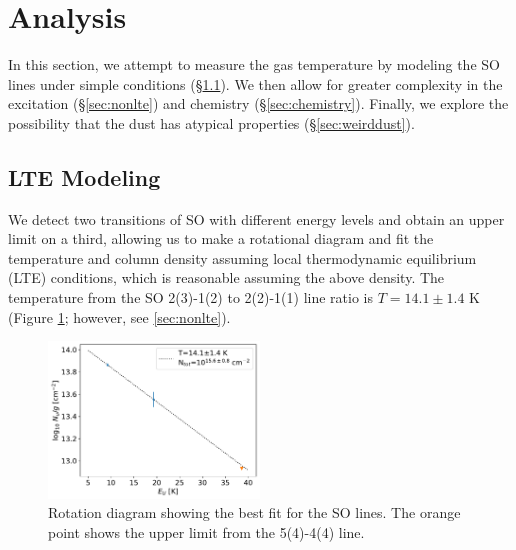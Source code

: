 \documentclass[]{aastex631}
\begin{document}
\section{Analysis}
\label{sec:analysis}

In this section, we attempt to measure the gas temperature by modeling the SO lines under simple conditions (\S \ref{sec:LTE}).
We then allow for greater complexity in the excitation (\S \ref{sec:nonlte}) and chemistry (\S \ref{sec:chemistry}).
Finally, we explore the possibility that the dust has atypical properties (\S \ref{sec:weirddust}).

\subsection{LTE Modeling}
\label{sec:LTE}
We detect two transitions of SO with different energy levels and obtain an upper limit on a third, allowing us to make a rotational diagram and fit the temperature and column density assuming local thermodynamic equilibrium (LTE) conditions, which is reasonable assuming the above density.
The temperature from the SO 2(3)-1(2) to 2(2)-1(1) line ratio is $T=14.1\pm 1.4$ K (Figure \ref{fig:LTErotationdiagram}; however, see \ref{sec:nonlte}).

\begin{figure}[!ht]
    \centering
    \includegraphics[width=0.5\textwidth]{figures/LTE_rotationdiagram_fit.pdf}
    \caption{Rotation diagram showing the best fit for the SO lines.
    The orange point shows the upper limit from the 5(4)-4(4) line.
    }
    \label{fig:LTErotationdiagram}
\end{figure}
\end{document}

